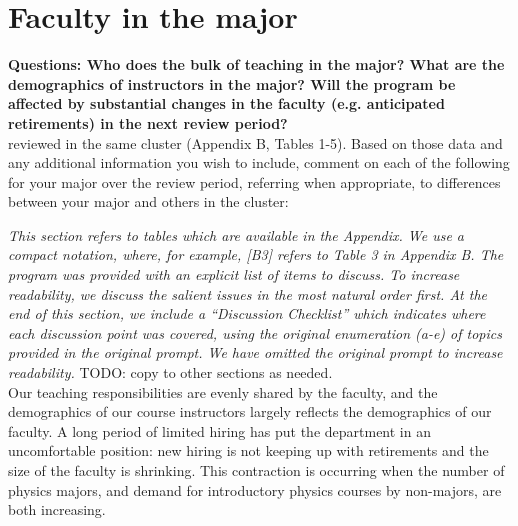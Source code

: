 \documentclass[12pt]{article}
\begin{document}
\newpage
\section{Faculty in the major}
\label{sec:faculty}

{\bf Questions: Who does the bulk of teaching in the major? What are
  the demographics of instructors in the major? Will the program be
  affected by substantial changes in the faculty (e.g. anticipated
  retirements) in the next review period?}\\[3pt]

reviewed in the same cluster (Appendix B, Tables 1-5). Based on those data and any additional 
information you wish to include, comment on each of the following for your major over the 
review period, referring when appropriate, to differences between your major and others in the 
cluster:

\noindent
{\it This section refers to tables which are available in the Appendix.  We
use a compact notation, where, for example, [B3] refers to Table 3 in
Appendix B.  The program was provided with an explicit list of items
to discuss.  To increase readability, we discuss the salient issues in
the most natural order first.  At the end of this section, we include a
``Discussion Checklist'' which indicates where each discussion point
was covered, using the original enumeration (a-e) of topics provided
in the original prompt. We have omitted the original prompt to
increase readability.}  {\color{red} TODO: copy to other sections as
      needed}.\\[3pt]

\noindent
Our teaching responsibilities are evenly shared by the faculty, and
the demographics of our course instructors largely reflects the
demographics of our faculty.  A long period of limited hiring has put
the department in an uncomfortable position: new hiring is not
keeping up with retirements and the size of the faculty is shrinking.
This contraction is occurring when the number of physics majors, and
demand for introductory physics courses by non-majors, are both
increasing.\\[3pt]
\end{document}
